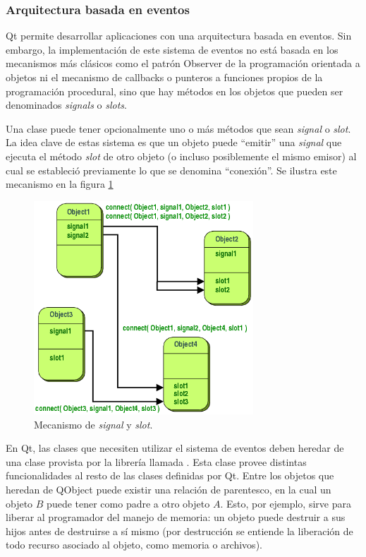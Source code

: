 \subsubsection{Arquitectura basada en eventos}\label{sec:qt}
Qt permite desarrollar aplicaciones con una arquitectura basada en eventos. Sin embargo, la implementación de este sistema de eventos no está basada en los mecanismos más clásicos como el patrón Observer de la programación orientada a objetos ni el mecanismo de callbacks o punteros a funciones propios de la programación procedural, sino que hay métodos en los objetos que pueden ser denominados \emph{signals} o \emph{slots}.

Una clase puede tener opcionalmente uno o más métodos que sean \emph{signal} o \emph{slot}. La idea clave de estas sistema es que un objeto puede \enquote{emitir} una \emph{signal} que ejecuta el método \emph{slot} de otro objeto (o incluso posiblemente el mismo emisor) al cual se estableció previamente lo que se denomina \enquote{conexión}. Se ilustra este mecanismo en la figura \ref{fig:signals-slots}

\begin{figure}[!ht]
	\centering
	\includegraphics[height=8cm]{imagenes/signal-slots.png}
	\caption{Mecanismo de \emph{signal} y \emph{slot}.}
	\label{fig:signals-slots}
\end{figure}

En Qt, las clases que necesiten utilizar el sistema de eventos deben heredar de una clase provista por la librería llamada . Esta clase provee distintas funcionalidades al resto de las clases definidas por Qt. Entre los objetos que heredan de QObject puede existir una relación de parentesco, en la cual un objeto $B$ puede tener como padre a otro objeto $A$. Esto, por ejemplo, sirve para liberar al programador del manejo de memoria: un objeto puede destruir a sus hijos antes de destruirse a sí mismo (por destrucción se entiende la liberación de todo recurso asociado al objeto, como memoria o archivos).

